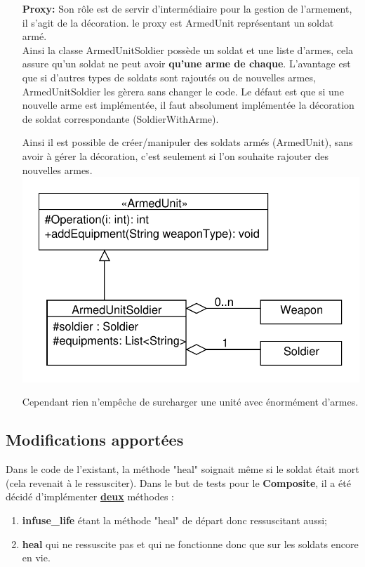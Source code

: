 \documentclass[12pt]{article}
\begin{document}
\begin{enumerate}
\item[\textbf{Proxy:}] Son rôle est de servir d'intermédiaire pour la gestion de l'armement, il s'agit de la décoration. le proxy est ArmedUnit représentant un soldat armé.\\
Ainsi la classe ArmedUnitSoldier possède un soldat et une liste d'armes,
cela assure qu'un soldat ne peut avoir \textbf{qu'une arme de chaque}.
L'avantage est que si d'autres types de soldats
sont rajoutés ou de nouvelles armes, ArmedUnitSoldier les gèrera sans changer le 
code. Le défaut est que si une nouvelle arme est implémentée, il faut absolument
implémentée la décoration de soldat correspondante (SoldierWith{Arme}).

Ainsi il est possible de créer/manipuler des soldats armés (ArmedUnit),
sans avoir à gérer la décoration, c'est seulement si l'on souhaite rajouter des nouvelles armes.
\includegraphics[scale=1]{../UML/Proxy}

Cependant rien n'empêche de surcharger une unité avec énormément d'armes.
\end{enumerate}
\subsection{Modifications apportées}
Dans le code de l'existant, la méthode "heal" soignait même si le soldat était mort (cela revenait à le ressusciter).
Dans le but de tests pour le \textbf{Composite}, il a été décidé d'implémenter \underline{\textbf{deux}} méthodes :
\begin{enumerate}
 \item \textbf{infuse\_life} étant la méthode "heal" de départ donc ressuscitant aussi;
 \item \textbf{heal} qui ne ressuscite pas et qui ne fonctionne donc que sur les soldats encore en vie.
\end{enumerate}
\end{document}
